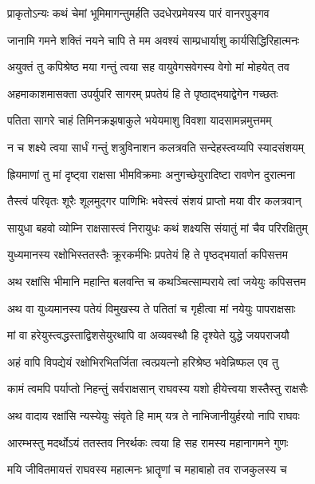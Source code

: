 \twolineshloka
{प्राकृतोऽन्यः कथं चेमां भूमिमागन्तुमर्हति}
{उदधेरप्रमेयस्य पारं वानरपुङ्गव} %

\twolineshloka
{जानामि गमने शक्तिं नयने चापि ते मम}
{अवश्यं साम्प्रधार्याशु कार्यसिद्धिरिहात्मनः} %

\twolineshloka
{अयुक्तं तु कपिश्रेष्ठ मया गन्तुं त्वया सह}
{वायुवेगसवेगस्य वेगो मां मोहयेत् तव} %

\twolineshloka
{अहमाकाशमासक्ता उपर्युपरि सागरम्}
{प्रपतेयं हि ते पृष्ठाद्भयाद्वेगेन गच्छतः} %

\twolineshloka
{पतिता सागरे चाहं तिमिनक्रझषाकुले}
{भयेयमाशु विवशा यादसामन्नमुत्तमम्} %

\twolineshloka
{न च शक्ष्ये त्वया सार्धं गन्तुं शत्रुविनाशन}
{कलत्रवति सन्देहस्त्वय्यपि स्यादसंशयम्} %

\twolineshloka
{ह्रियमाणां तु मां दृष्ट्वा राक्षसा भीमविक्रमाः}
{अनुगच्छेयुरादिष्टा रावणेन दुरात्मना} %

\twolineshloka
{तैस्त्वं परिवृतः शूरैः शूलमुद्गर पाणिभिः}
{भवेस्त्वं संशयं प्राप्तो मया वीर कलत्रवान्} %

\twolineshloka
{सायुधा बहवो व्योम्नि राक्षसास्त्वं निरायुधः}
{कथं शक्ष्यसि संयातुं मां चैव परिरक्षितुम्} %

\twolineshloka
{युध्यमानस्य रक्षोभिस्ततस्तैः क्रूरकर्मभिः}
{प्रपतेयं हि ते पृष्ठद्भयार्ता कपिसत्तम} %

\twolineshloka
{अथ रक्षांसि भीमानि महान्ति बलवन्ति च}
{कथञ्चित्साम्पराये त्वां जयेयुः कपिसत्तम} %

\twolineshloka
{अथ वा युध्यमानस्य पतेयं विमुखस्य ते}
{पतितां च गृहीत्वा मां नयेयुः पापराक्षसाः} %

\twolineshloka
{मां वा हरेयुस्त्वद्धस्ताद्विशसेयुरथापि वा}
{अव्यवस्थौ हि दृश्येते युद्धे जयपराजयौ} %

\twolineshloka
{अहं वापि विपद्येयं रक्षोभिरभितर्जिता}
{त्वत्प्रयत्नो हरिश्रेष्ठ भवेन्निष्फल एव तु} %

\twolineshloka
{कामं त्वमपि पर्याप्तो निहन्तुं सर्वराक्षसान्}
{राघवस्य यशो हीयेत्त्वया शस्तैस्तु राक्षसैः} %

\twolineshloka
{अथ वादाय रक्षांसि न्यस्येयुः संवृते हि माम्}
{यत्र ते नाभिजानीयुर्हरयो नापि राघवः} %

\twolineshloka
{आरम्भस्तु मदर्थोऽयं ततस्तव निरर्थकः}
{त्वया हि सह रामस्य महानागमने गुणः} %

\twolineshloka
{मयि जीवितमायत्तं राघवस्य महात्मनः}
{भ्रातॄणां च महाबाहो तव राजकुलस्य च} %

